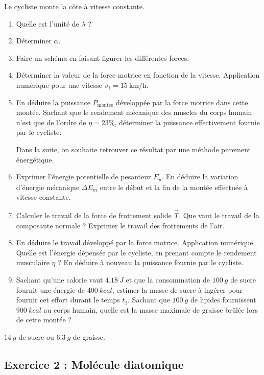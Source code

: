 Le cycliste monte la côte à vitesse constante.

\begin{enumerate}
	\item Quelle est l'unité de $\lambda$ ?
	\item Déterminer $\alpha$.
	\item Faire un schéma en faisant figurer les différentes forces.
	\item Déterminer la valeur de la force motrice en fonction de la vitesse. Application numérique pour une vitesse $v_1 = \SI{15}{\kilo\meter\per\hour}$.
	\item En déduire la puissance $P_{\textrm{montee}}$ développée par la force motrice dans cette montée. Sachant que le rendement mécanique des muscles du corps humain n'est que de l'ordre de $\eta = 23\%$, déterminer la puissance effectivement fournie par le cycliste. 
	
	Dans la suite, on souhaite retrouver ce résultat par une méthode purement énergétique.
	\item Exprimer l'énergie potentielle de pesanteur $E_p$. En déduire la variation d'énergie mécanique $\Delta E_m$ entre le début et la fin de la montée effectuée à vitesse constante.
	\item Calculer le travail de la force de frottement solide $\vec{T}$. Que vaut le travail de la composante normale ? Exprimer le travail des frottements de l'air.
	\item En déduire le travail développé par la force motrice. Application numérique. Quelle est l'énergie dépensée par le cycliste, en prenant compte le rendement musculaire $\eta$ ? En déduire à nouveau la puissance fournie par le cycliste.
	\item Sachant qu'une calorie vaut $\SI{4.18}{J}$ et que la consommation de $\SI{100}{g}$ de sucre fournit une énergie de $\SI{400}{kcal}$, estimer la masse de sucre à ingérer pour fournir cet effort durant le temps $t_1$. Sachant que $\SI{100}{g}$ de lipides fournissent $\SI{900}{kcal}$ au corps humain, quelle est la masse maximale de graisse brûlée lors de cette montée ?
\end{enumerate}

 $\SI{14}{g}$ de sucre ou $\SI{6.3}{g}$ de graisse.

\subsection{Exercice 2 : Molécule diatomique}

